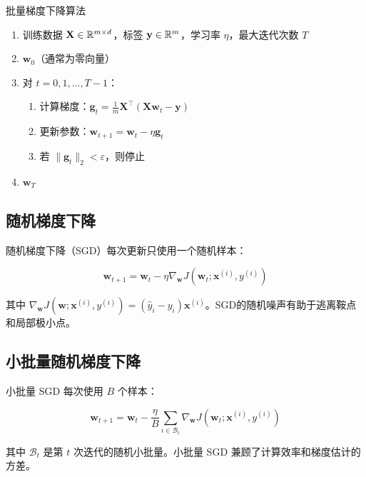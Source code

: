 \begin{myalgorithm}{批量梯度下降算法}
\begin{enumerate}
    \item [输入:] 训练数据 $\mathbf{X}\in\mathbb{R}^{m\times d}$，标签 $\mathbf{y}\in\mathbb{R}^m$，学习率 $\eta$，最大迭代次数 $T$
    \item [初始化:] $\mathbf{w}_0$（通常为零向量）
    \item [循环:] 对 $t=0,1,\ldots,T-1$：
    \begin{enumerate}
        \item 计算梯度：$\mathbf{g}_t = \frac{1}{m}\mathbf{X}^{\top}(\mathbf{X}\mathbf{w}_t-\mathbf{y})$
        \item 更新参数：$\mathbf{w}_{t+1} = \mathbf{w}_t - \eta\mathbf{g}_t$
        \item 若 $\|\mathbf{g}_t\|_2 < \varepsilon$，则停止
    \end{enumerate}
    \item [输出:] $\mathbf{w}_T$
\end{enumerate}
\end{myalgorithm}

\subsection{随机梯度下降}

随机梯度下降（SGD）每次更新只使用一个随机样本：

\[
\mathbf{w}_{t+1} = \mathbf{w}_t - \eta \nabla_{\mathbf{w}} J(\mathbf{w}_t; \mathbf{x}^{(i)}, y^{(i)})
\]

其中 $\nabla_{\mathbf{w}} J(\mathbf{w}; \mathbf{x}^{(i)}, y^{(i)}) = (\hat{y}_i - y_i)\mathbf{x}^{(i)}$。SGD的随机噪声有助于逃离鞍点和局部极小点。

\subsection{小批量随机梯度下降}

小批量 SGD 每次使用 $B$ 个样本：

\[
\mathbf{w}_{t+1} = \mathbf{w}_t - \frac{\eta}{B} \sum_{i\in\mathcal{B}_t} \nabla_{\mathbf{w}} J(\mathbf{w}_t; \mathbf{x}^{(i)}, y^{(i)})
\]

其中 $\mathcal{B}_t$ 是第 $t$ 次迭代的随机小批量。小批量 SGD 兼顾了计算效率和梯度估计的方差。

